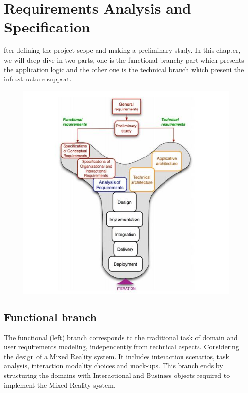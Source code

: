 %
%
\let\textcircled=\pgftextcircled
\chapter{Requirements Analysis and Specification}
\label{chap:intro}

fter defining the project scope and making a preliminary study. In this chapter, we will deep dive in two
 parts, one is the functional branchy part which presents the application logic and the other one is the technical
  branch which present the infrastructure support.
\begin{figure}[h!]
	\centering
	\includegraphics[height=0.4\textheight]{fig01/Capture}
	\label{fig:FilialesEtClients}
\end{figure}
\section{Functional branch}
\label{sec:sec01}
The functional (left) branch corresponds to the traditional task of domain and
user requirements modeling, independently from technical aspects. Considering
the design of a Mixed Reality system. It includes interaction scenarios, task analysis, 
interaction modality choices and mock-ups. This branch ends by structuring the domains with
Interactional and Business objects required to implement the Mixed Reality
system.
